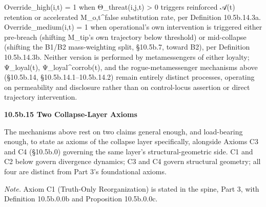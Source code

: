 \documentclass[
]{article}
\begin{document}
Override\_high(i,t) = 1 when Θ\_threat(i,j,t) \textgreater{} 0 triggers
reinforced 𝒜(t) retention or accelerated M\_o,t\^{}false substitution
rate, per Definition 10.5b.14.3a. Override\_medium(i,t) = 1 when
operational's own intervention is triggered either pre-breach (shifting
M\_tip's own trajectory below threshold) or mid-collapse (shifting the
B1/B2 mass-weighting split, §10.5b.7, toward B2), per Definition
10.5b.14.3b. Neither version is performed by metamessengers of either
loyalty; Ψ\_loyal(t), Ψ\_loyal\^{}corrob(t), and the rogue-metamessenger
mechanisms above (§10.5b.14, §10.5b.14.1--10.5b.14.2) remain entirely
distinct processes, operating on permeability and disclosure rather than
on control-locus assertion or direct trajectory intervention.

\textbf{10.5b.15 Two Collapse-Layer Axioms}

The mechanisms above rest on two claims general enough, and load-bearing
enough, to state as axioms of the collapse layer specifically, alongside
Axioms C3 and C4 (§10.5b.0) governing the same layer's
structural-geometric side. C1 and C2 below govern divergence dynamics;
C3 and C4 govern structural geometry; all four are distinct from Part
3's foundational axioms.

\emph{Note.} Axiom C1 (Truth-Only Reorganization) is stated in the
spine, Part 3, with Definition 10.5b.0.0b and Proposition 10.5b.0.0c.
\end{document}
